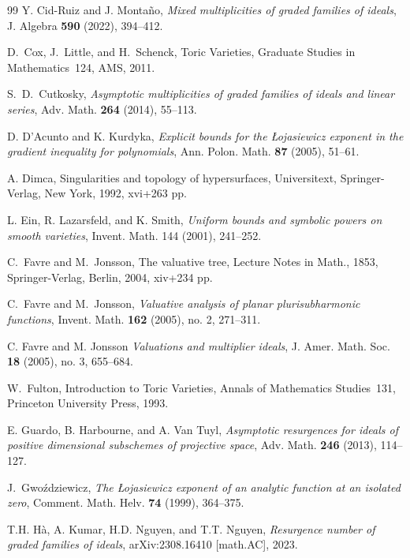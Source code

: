 \documentclass[12pt]{amsart}
\theoremstyle{plain}
\theoremstyle{definition}
\numberwithin{equation}{section}
\begin{document}
\begin{thebibliography}{99}
    Y. Cid-Ruiz and J. Monta\~no,
    \emph{Mixed multiplicities of graded families of ideals},
    J. Algebra \textbf{590} (2022), 394--412.
	
	
	D.~Cox, J.~Little, and H.~Schenck,
	Toric Varieties,
	Graduate Studies in Mathematics~124,
	AMS, 2011.


    S.~D.~Cutkosky,
    \emph{Asymptotic multiplicities of graded families of ideals and linear series},
    Adv. Math. \textbf{264} (2014), 55--113.
	
	D. D'Acunto and K. Kurdyka,
	\emph{Explicit bounds for the \L{}ojasiewicz exponent in the gradient inequality for polynomials},
	Ann. Polon. Math. \textbf{87} (2005), 51--61.
	
	A. Dimca,
	Singularities and topology of hypersurfaces,
	Universitext,
	Springer-Verlag, New York, 1992, xvi+263 pp.
	
	L. Ein, R. Lazarsfeld, and K. Smith,
	\emph{Uniform bounds and symbolic powers on smooth varieties},
	Invent. Math. 144 (2001), 241--252.
	
	C.~Favre and M.~Jonsson, 
	The valuative tree,
	Lecture Notes in Math., 1853,
	Springer-Verlag, Berlin, 2004, xiv+234 pp.
	
	C.~Favre and M.~Jonsson, 
	\emph{Valuative analysis of planar plurisubharmonic functions},
	Invent. Math. \textbf{162} (2005), no. 2, 271--311.

    C. Favre and M. Jonsson
    \emph{Valuations and multiplier ideals},
    J. Amer. Math. Soc. \textbf{18} (2005), no. 3, 655--684.
	
	W.~Fulton,
	Introduction to Toric Varieties,
	Annals of Mathematics Studies~131,
	Princeton University Press, 1993.
	

	E. Guardo, B. Harbourne, and A. Van Tuyl,
	\emph{Asymptotic resurgences for ideals of positive dimensional subschemes of projective space},
	Adv. Math. \textbf{246} (2013), 114--127.
	
	J.~Gwo\'zdziewicz,
	\emph{The \L ojasiewicz exponent of an analytic function at an isolated zero},
	Comment. Math. Helv. \textbf{74} (1999), 364--375.
	
	T.H. H\`a, A. Kumar, H.D. Nguyen, and T.T. Nguyen,
	\emph{Resurgence number of graded families of ideals},
	arXiv:2308.16410 [math.AC], 2023.
	

\end{thebibliography}
\end{document}
